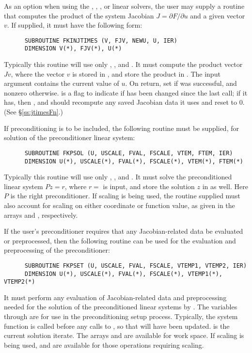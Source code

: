 \begin{Steps}
  As an option when using the {\spgmr}, {\spfgmr}, {\spbcg}, or {\sptfqmr}  
  linear solvers, 
  the user may supply a routine that computes the product of the system Jacobian 
  $J = \partial F / \partial u$ 
  and a given vector $v$.  If supplied, it must have the following form:
\begin{verbatim}
      SUBROUTINE FKINJTIMES (V, FJV, NEWU, U, IER)
      DIMENSION V(*), FJV(*), U(*)
\end{verbatim}
  Typically this routine will use only , , and .
  It must compute the product vector $Jv$, where the vector $v$ is
  stored in , and store the product in .  
  The input argument  contains the current value of $u$.  On return, set
   if  was successful, and nonzero otherwise.
   is a flag to indicate if  has been changed since the last
  call; if it has, then , and  should recompute any
  saved Jacobian data it uses and reset  to 0.  (See \S\ref{ss:jtimesFn}.)

  If preconditioning is to be included, the following routine must be
  supplied, for solution of the preconditioner linear system:
\begin{verbatim}
      SUBROUTINE FKPSOL (U, USCALE, FVAL, FSCALE, VTEM, FTEM, IER)
      DIMENSION U(*), USCALE(*), FVAL(*), FSCALE(*), VTEM(*), FTEM(*)
\end{verbatim}
  Typically this routine will use only , ,  and .
  It must solve the preconditioned linear system $Pz = r$, where
  $r = $  is input, and store the solution $z$ in  as well. 
  Here $P$ is the right preconditioner. If scaling is being used, the
  routine supplied must also account for scaling on either coordinate
  or function value, as given in the arrays  and
  , respectively.
  
  If the user's preconditioner requires that any Jacobian-related data be evaluated
  or preprocessed, then the following routine can be used for the evaluation and
  preprocessing of the preconditioner:
\begin{verbatim}
      SUBROUTINE FKPSET (U, USCALE, FVAL, FSCALE, VTEMP1, VTEMP2, IER)
      DIMENSION U(*), USCALE(*), FVAL(*), FSCALE(*), VTEMP1(*), VTEMP2(*)
\end{verbatim}
  It must perform any evaluation of Jacobian-related data and
  preprocessing needed for the solution of the preconditioned linear
  systems by . The variables  through  are for use in the
  preconditioning setup process. Typically, the system function  is
  called before any calls to , so that  will have
  been updated.  is the current solution
  iterate. The arrays  and  are available for work space. 
  If scaling is being used,  and  are available for those operations
  requiring scaling.
  

\end{Steps}
